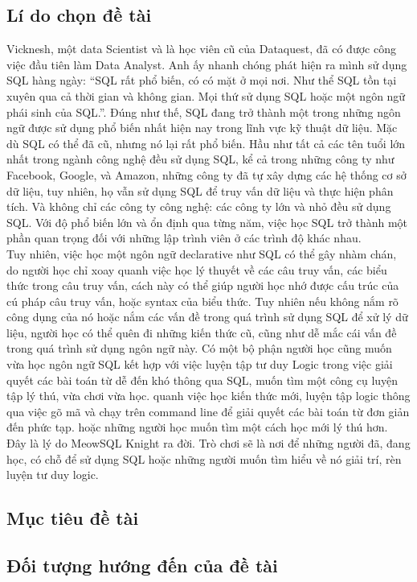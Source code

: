 \subsection{Lí do chọn đề tài}
Vicknesh, một data Scientist và là học viên cũ của Dataquest, đã có được công việc đầu tiên làm Data Analyst. Anh ấy nhanh chóng phát hiện ra mình sử dụng SQL hàng ngày: “SQL rất phổ biến, có có mặt ở mọi nơi. Như thể SQL tồn tại xuyên qua cả thời gian và không gian. Mọi thứ sử dụng SQL hoặc một ngôn ngữ phái sinh của SQL.”.
Đúng như thế, SQL đang trở thành một trong những ngôn ngữ được sử dụng phổ biến nhất hiện nay trong lĩnh vực kỹ thuật dữ liệu. Mặc dù SQL có thể đã cũ, nhưng nó lại rất phổ biến. Hầu như tất cả các tên tuổi lớn nhất trong ngành công nghệ đều sử dụng SQL, kể cả trong những công ty như Facebook, Google, và Amazon, những công ty đã tự xây dựng các hệ thống cơ sở dữ liệu, tuy nhiên, họ vẫn sử dụng SQL để truy vấn dữ liệu và thực hiện phân tích. Và không chỉ các công ty công nghệ: các công ty lớn và nhỏ đều sử dụng SQL. 
Với độ phổ biến lớn và ổn định qua từng năm, việc học SQL trở thành một phần quan trọng đối với những lập trình viên ở các trình độ khác nhau.\\
Tuy nhiên, việc học một ngôn ngữ declarative như SQL có thể gây nhàm chán, do người học chỉ xoay quanh việc học lý thuyết về các câu truy vấn, các biểu thức trong câu truy vấn, cách này có thể giúp người học nhớ được cấu trúc của cú pháp câu truy vấn, hoặc syntax của biểu thức. Tuy nhiên nếu không nắm rõ công dụng của nó hoặc nắm các vấn đề trong quá trình sử dụng SQL để xử lý dữ liệu, người học có thể quên đi những kiến thức cũ, cũng như dễ mắc cái vấn đề trong quá trình sử dụng ngôn ngữ này. Có một bộ phận người học cũng muốn vừa học ngôn ngữ SQL kết hợp với việc luyện tập tư duy Logic trong việc giải quyết các bài toán từ dễ đến khó thông qua SQL, muốn tìm một công cụ luyện tập lý thú, vừa chơi vừa học. 
quanh việc học kiến thức mới, luyện tập logic thông qua việc gõ mã và chạy trên command
line để giải quyết các bài toán từ đơn giản đến phức tạp. hoặc những người học muốn tìm một cách học mới lý thú hơn.\\

Đây là lý do MeowSQL Knight ra đời. Trò chơi sẽ là nơi để những người đã, đang học, có chỗ để sử dụng SQL hoặc những người muốn tìm hiểu về nó giải trí, rèn luyện tư duy logic.
\subsection{Mục tiêu đề tài}
\subsection{Đối tượng hướng đến của đề tài}